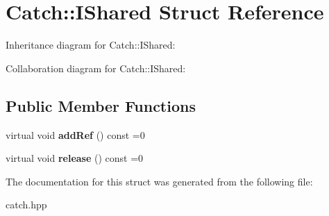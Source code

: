 \hypertarget{struct_catch_1_1_i_shared}{}\section{Catch\+:\+:I\+Shared Struct Reference}
\label{struct_catch_1_1_i_shared}


Inheritance diagram for Catch\+:\+:I\+Shared\+:


Collaboration diagram for Catch\+:\+:I\+Shared\+:
\subsection*{Public Member Functions}
\begin{DoxyCompactItemize}
\item 
\mbox{\label{struct_catch_1_1_i_shared_ae383df68557cdaf0910b411af04d9e33}} 
virtual void {\bfseries add\+Ref} () const =0
\item 
\mbox{\label{struct_catch_1_1_i_shared_a002f52624728a763956fb6f230cb2f57}} 
virtual void {\bfseries release} () const =0
\end{DoxyCompactItemize}


The documentation for this struct was generated from the following file\+:\begin{DoxyCompactItemize}
\item 
catch.\+hpp\end{DoxyCompactItemize}
